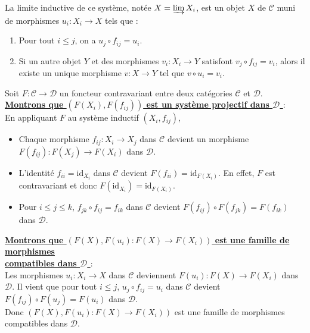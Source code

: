 \documentclass[a4paper, 14pt]{report}
\begin{document}
\begin{onehalfspace}
{			La limite inductive de ce syst\`eme, not\'ee \( X = \varinjlim X_i \), est un objet $X$ de  \( \mathcal{C} \) muni de morphismes \( u_i: X_i \to X \) tels que :
			\begin{enumerate}
				\item Pour tout \( i \leq j \), on a \( u_j \circ f_{ij} = u_i \).
				\item Si un autre objet \( Y \) et des morphismes \( v_i: X_i \to Y \) satisfont \( v_j \circ f_{ij} = v_i \), alors il existe un unique morphisme \( v: X \to Y \) tel que \( v \circ u_i = v_i \).
			\end{enumerate}
			
			Soit \( F: \mathcal{C} \to \mathcal{D} \) un foncteur contravariant entre deux cat\'egories \( \mathcal{C} \) et \( \mathcal{D} \). \\
			
			\textbf{\underline{Montrons que \( (F(X_i), F(f_{ij}) ) \) est un système projectif dans \( \mathcal{D} \) }}: \\
			
			En appliquant \( F \) au système inductif \( (X_i, f_{ij}) \),  
			\begin{itemize}
				\item Chaque morphisme \( f_{ij}: X_i \to X_j \) dans \( \mathcal{C} \) devient un morphisme \\
				\( F(f_{ij}): F(X_j) \to F(X_i) \) dans \( \mathcal{D} \).
				\item L'identité \( f_{ii} = \text{id}_{X_i} \) dans \( \mathcal{C} \) devient \( F(f_{ii}) = \text{id}_{F(X_i)} \). En effet, \( F \) est contravariant et donc \( F(\text{id}_{X_i}) = \text{id}_{F(X_i)} \).
				\item Pour \( i \leq j \leq k \), \( f_{jk} \circ f_{ij} = f_{ik} \) dans \( \mathcal{C} \) devient \( F(f_{ij}) \circ F(f_{jk}) = F(f_{ik}) \) dans \( \mathcal{D} \).
			\end{itemize}
			
			\textbf{\underline{Montrons que \( (F(X), F(u_{i}) : F(X) \to F(X_i) ) \) est une famille de morphismes }} \\
			
			\textbf{\underline{compatibles dans \( \mathcal{D} \) }}: \\
			
			Les morphismes \( u_i: X_i \to X \) dans \( \mathcal{C} \) deviennent  \( F(u_i) : F(X) \to F(X_i) \) dans \( \mathcal{D} \). Il vient que pour tout \( i \leq j \), \( u_j \circ f_{ij} = u_i \) dans \( \mathcal{C} \) devient \( F(f_{ij}) \circ F(u_j) = F(u_i) \) dans \( \mathcal{D} \).\\
			Donc \( (F(X), F(u_{i}) : F(X) \to F(X_i) ) \) est une famille de morphismes compatibles dans \( \mathcal{D} \). \\
			
}
\end{onehalfspace}
\end{document}
